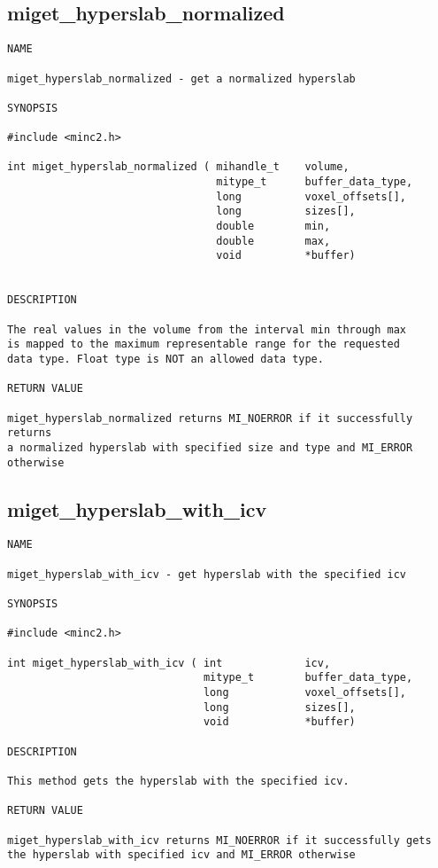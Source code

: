 \documentclass{article}
\begin{document}
\subsection{miget\_hyperslab\_normalized}
\begin{verbatim}
NAME

miget_hyperslab_normalized - get a normalized hyperslab

SYNOPSIS

#include <minc2.h>

int miget_hyperslab_normalized ( mihandle_t    volume,
                                 mitype_t      buffer_data_type,
                                 long          voxel_offsets[],
                                 long          sizes[],
                                 double        min,
                                 double        max,
                                 void          *buffer)
                                  
                                
DESCRIPTION

The real values in the volume from the interval min through max
is mapped to the maximum representable range for the requested
data type. Float type is NOT an allowed data type.

RETURN VALUE

miget_hyperslab_normalized returns MI_NOERROR if it successfully returns
a normalized hyperslab with specified size and type and MI_ERROR otherwise
\end{verbatim}


\subsection{miget\_hyperslab\_with\_icv}
\begin{verbatim}
NAME

miget_hyperslab_with_icv - get hyperslab with the specified icv

SYNOPSIS

#include <minc2.h>

int miget_hyperslab_with_icv ( int             icv,
                               mitype_t        buffer_data_type,
                               long            voxel_offsets[],
                               long            sizes[],
                               void            *buffer)                
                                        
DESCRIPTION

This method gets the hyperslab with the specified icv.

RETURN VALUE

miget_hyperslab_with_icv returns MI_NOERROR if it successfully gets
the hyperslab with specified icv and MI_ERROR otherwise
\end{verbatim}
\end{document}
